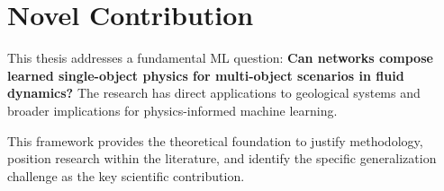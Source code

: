 \section{Novel Contribution}

This thesis addresses a fundamental ML question: \textbf{Can networks compose learned single-object physics for multi-object scenarios in fluid dynamics?} The research has direct applications to geological systems and broader implications for physics-informed machine learning.

This framework provides the theoretical foundation to justify methodology, position research within the literature, and identify the specific generalization challenge as the key scientific contribution.
